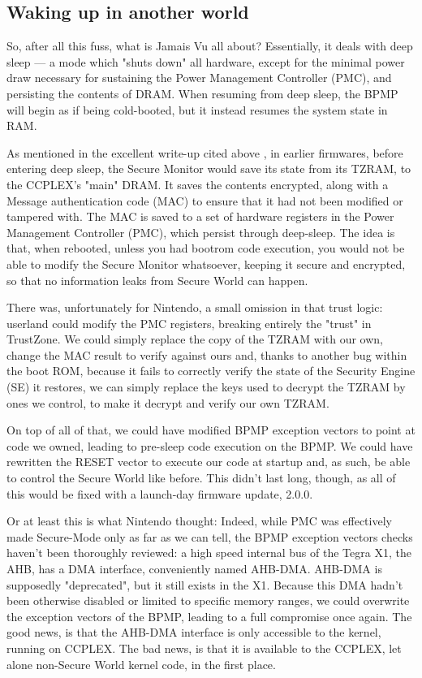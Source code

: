 \documentclass[journal]{IEEEtran}
\begin{document}
\subsection{Waking up in another world}

So, after all this fuss, what is Jamais Vu all about? Essentially, it deals with deep sleep --- a
mode which "shuts down" all hardware, except for the minimal power draw necessary for sustaining the
Power Management Controller (PMC), and persisting the contents of DRAM. When resuming from deep
sleep, the BPMP will begin as if being cold-booted, but it instead resumes the system state in RAM.

As mentioned in the excellent write-up cited above \cite{jamais_vu}, in earlier firmwares,
before entering deep sleep, the Secure Monitor would save its state from its TZRAM, to the CCPLEX's
"main" DRAM. It saves the contents encrypted, along with a Message authentication code (MAC) to
ensure that it had not been modified or tampered with. The MAC is saved to a set of hardware
registers in the Power Management Controller (PMC), which persist through deep-sleep. The idea is
that, when rebooted, unless you had bootrom code execution, you would not be able to modify the
Secure Monitor whatsoever, keeping it secure and encrypted, so that no information leaks
from Secure World can happen.

There was, unfortunately for Nintendo, a small omission in that trust logic: userland could modify
the PMC registers, breaking entirely the "trust" in TrustZone. We could simply replace the copy
of the TZRAM with our own, change the MAC result to verify against ours and, thanks to another
bug within the boot ROM, because it fails to correctly verify the state of the Security Engine (SE)
it restores, we can simply replace the keys used to decrypt the TZRAM by ones we control, to
make it decrypt and verify our own TZRAM.

On top of all of that, we could have modified BPMP exception vectors to point at code we owned,
leading to pre-sleep code execution on the BPMP.
We could have rewritten the RESET vector to execute our code at startup and, as such, be able to
control the Secure World like before. This didn't last long, though, as all of this would be fixed
with a launch-day firmware update, 2.0.0.

Or at least this is what Nintendo thought: Indeed, while PMC was effectively made Secure-Mode only
as far as we can tell, the BPMP exception vectors checks haven't been thoroughly reviewed:
a high speed internal bus of the Tegra X1, the AHB, has a DMA interface, conveniently named AHB-DMA.
AHB-DMA is supposedly "deprecated", but it still exists in the X1. Because this DMA hadn't been
otherwise disabled or limited to specific memory ranges, we could overwrite the exception vectors
of the BPMP, leading to a full compromise once again.
The good news, is that the AHB-DMA interface is only accessible to the kernel, running on CCPLEX.
The bad news, is that it is available to the CCPLEX, let alone non-Secure World kernel code, in the
first place.
\end{document}
